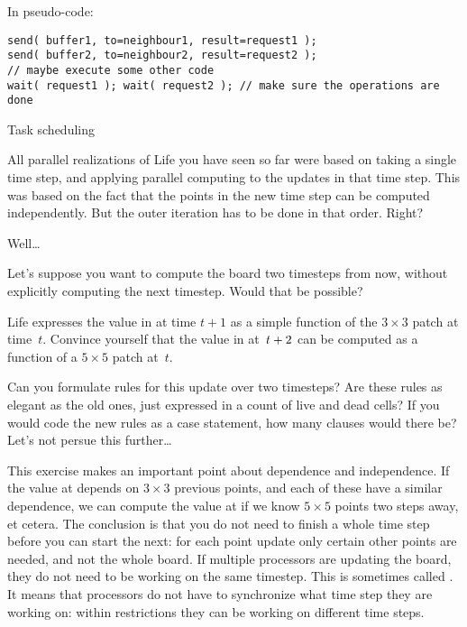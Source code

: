 In pseudo-code:
\begin{verbatim}
send( buffer1, to=neighbour1, result=request1 );
send( buffer2, to=neighbour2, result=request2 );
// maybe execute some other code
wait( request1 ); wait( request2 ); // make sure the operations are done
\end{verbatim}

 {Task scheduling}
\label{sec:dag}

All parallel realizations of Life you have seen so far were based
on taking a single time step, and applying parallel computing to
the updates in that time step. This was based on the fact that
the points in the new time step can be computed independently.
But the outer iteration has to be done in that order. Right?

Well\ldots

Let's suppose you want to compute the board two timesteps from
now, without explicitly computing the next timestep. Would that be possible?

\begin{exercise}
  Life expresses the value in  at time $t+1$ as a simple
  function of the $3\times3$ patch  at time~$t$.
  Convince yourself that the value in  at~$t+\nobreak2$ can be
  computed as a function of a $5\times5$ patch at~$t$.

  Can you formulate rules for this update over two timesteps? Are
  these rules as elegant as the old ones, just expressed in a count of
  live and dead cells? If you would code the new rules as a case
  statement, how many clauses would there be? Let's not persue this
  further\ldots
\end{exercise}

This exercise makes an important point about dependence and
independence. If the value at  depends on
$3\times3$ previous points, and each of these have a similar
dependence, we can compute the value at  
if we know $5\times5$ points two steps away, et cetera.
The conclusion is that you do not need to finish a whole time step before you 
can start the next: for each point update only certain other points
are needed, and not the whole board. If multiple processors are updating the board,
they do not need to be working on the same timestep.
This
is sometimes called .
It means that processors do not have to synchronize what time step they are working on:
within restrictions they can be working on different time steps.


